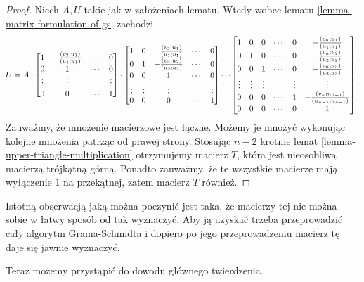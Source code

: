 \documentclass[12pt,a4paper]{report}
\newcommand{\mx}[1]{{#1}}
\newcommand{\proj}[2]{\frac{\scalar{#2}{#1}}{\scalar{#1}{#1}}}
\begin{document}
\begin{proof}
Niech $\mx{A}, \mx{U}$ takie jak w założeniach lematu. Wtedy wobec lematu \ref{lemma-matrix-formulation-of-gs} zachodzi 
$$
U = A \cdot 
\begin{bmatrix}
1 & -\proj{u_1}{v_2} & \cdots & 0 \\
0 & 1 & \cdots & 0 \\
\vdots & \vdots &  & \vdots \\
0 & 0 & \cdots & 1
\end{bmatrix} \cdot
\begin{bmatrix}
1 & 0 & -\proj{u_1}{v_3} &\cdots & 0 \\
0 & 1 & -\proj{u_2}{v_3} &\cdots & 0 \\
0 & 0 & 1 & \cdots & 0 \\
\vdots & \vdots & \vdots &  & \vdots \\
0 & 0 & 0 & \cdots & 1
\end{bmatrix}
 \cdots
\begin{bmatrix}
1 & 0 & 0 & \cdots & 0 & -\proj{u_1}{v_n} \\
0 & 1 & 0 & \cdots & 0 &-\proj{u_2}{v_n} \\
0 & 0 & 1 & \cdots & 0 & -\proj{u_3}{v_n} \\
\vdots & \vdots & \vdots &  & \vdots & \vdots \\
0 & 0 & 0 & \cdots & 1 & -\proj{u_{n-1}}{v_n} \\
0 & 0 & 0 & \cdots & 0 & 1
\end{bmatrix}.
$$ 
Zauważmy, że mnożenie macierzowe jest łączne. Możemy je mnożyć wykonując kolejne mnożenia patrząc od prawej strony. Stosując $n-2$ krotnie lemat \ref{lemma-upper-triangle-multiplication} otrzymujemy macierz $\mx{T}$, która jest nieosobliwą macierzą trójkątną górną. Ponadto zauważmy, że te wszystkie macierze mają wyłączenie $1$ na przekątnej, zatem macierz $\mx{T}$ również. 
\end{proof}

Istotną obserwacją jaką można poczynić jest taka, że macierzy tej nie można sobie w łatwy sposób od tak wyznaczyć. Aby ją uzyskać trzeba przeprowadzić cały algorytm Grama-Schmidta i dopiero po jego przeprowadzeniu macierz tę daje się jawnie wyznaczyć.


Teraz możemy przystąpić do dowodu głównego twierdzenia.
\end{document}
